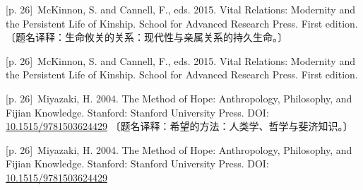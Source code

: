 \documentclass[10pt,a4paper]{article}
\begin{document}
\noindent\begin{minipage}{\textwidth}\begin{minipage}[t]{\dimexpr.5\textwidth-4mm\relax}\noindent\begin{minipage}[t]{\linewidth}{\scriptsize\color{gray} [p. 26]}\ McKinnon, S. and Cannell, F., eds. 2015. Vital Relations: Modernity and the Persistent Life of Kinship. School for Advanced Research Press. First edition. 〔题名译释：生命攸关的关系：现代性与亲属关系的持久生命。〕\par\end{minipage}\par\end{minipage}\hfill\begin{minipage}[t]{\dimexpr.5\textwidth-4mm\relax}\noindent\begin{minipage}[t]{\linewidth}{\scriptsize\color{gray} [p. 26]}\ McKinnon, S. and Cannell, F., eds. 2015. Vital Relations: Modernity and the Persistent Life of Kinship. School for Advanced Research Press. First edition.\par\end{minipage}\par\end{minipage}\end{minipage}\par
\noindent\begin{minipage}{\textwidth}\begin{minipage}[t]{\dimexpr.5\textwidth-4mm\relax}\noindent\begin{minipage}[t]{\linewidth}{\scriptsize\color{gray} [p. 26]}\ Miyazaki, H. 2004. The Method of Hope: Anthropology, Philosophy, and Fijian Knowledge. Stanford: Stanford University Press. DOI: \url{10.1515/9781503624429} 〔题名译释：希望的方法：人类学、哲学与斐济知识。〕\par\end{minipage}\par\end{minipage}\hfill\begin{minipage}[t]{\dimexpr.5\textwidth-4mm\relax}\noindent\begin{minipage}[t]{\linewidth}{\scriptsize\color{gray} [p. 26]}\ Miyazaki, H. 2004. The Method of Hope: Anthropology, Philosophy, and Fijian Knowledge. Stanford: Stanford University Press. DOI: \url{10.1515/9781503624429}\par\end{minipage}\par\end{minipage}\end{minipage}\par
\end{document}
